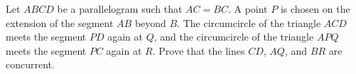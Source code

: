 Let $ABCD$ be a parallelogram such that $AC = BC$. A point $P$ is chosen on the extension of the segment $AB$ beyond $B$. The circumcircle of the triangle $ACD$ meets the segment $PD$ again at $Q$, and the circumcircle of the triangle $APQ$ meets the segment $PC$ again at $R$. Prove that the lines $CD$, $AQ$, and $BR$ are concurrent.
